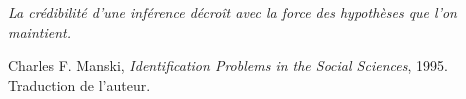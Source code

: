 %
%

\newcommand{\fondateurnexialog}{Ali~BEHBAHANI}

%
\thispagestyle{empty}
\vspace*{0.30\textheight}

\begin{flushright}
\begin{minipage}{0.72\textwidth}
\itshape
La crédibilité d'une inférence décroît avec la force des hypothèses que l'on
maintient.

\vspace{10pt}
\normalfont\small\raggedleft
Charles F. Manski, \emph{Identification Problems in the Social Sciences}, 1995.\\
\textup{Traduction de l'auteur.}
\end{minipage}
\end{flushright}

\clearpage

